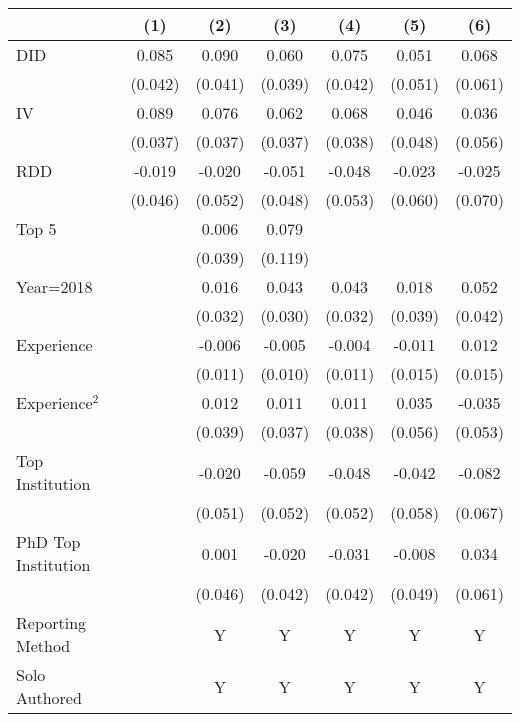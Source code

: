 \begin{tabular}{l*{6}{c}}
\hline\hline
                &\multicolumn{1}{c}{(1)}&\multicolumn{1}{c}{(2)}&\multicolumn{1}{c}{(3)}&\multicolumn{1}{c}{(4)}&\multicolumn{1}{c}{(5)}&\multicolumn{1}{c}{(6)}\\
\hline
DID             &    0.085&    0.090&    0.060&    0.075&    0.051&    0.068\\
                &  (0.042)&  (0.041)&  (0.039)&  (0.042)&  (0.051)&  (0.061)\\
IV              &    0.089&    0.076&    0.062&    0.068&    0.046&    0.036\\
                &  (0.037)&  (0.037)&  (0.037)&  (0.038)&  (0.048)&  (0.056)\\
RDD             &   -0.019&   -0.020&   -0.051&   -0.048&   -0.023&   -0.025\\
                &  (0.046)&  (0.052)&  (0.048)&  (0.053)&  (0.060)&  (0.070)\\
Top 5           &         &    0.006&    0.079&         &         &         \\
                &         &  (0.039)&  (0.119)&         &         &         \\
Year=2018       &         &    0.016&    0.043&    0.043&    0.018&    0.052\\
                &         &  (0.032)&  (0.030)&  (0.032)&  (0.039)&  (0.042)\\
Experience      &         &   -0.006&   -0.005&   -0.004&   -0.011&    0.012\\
                &         &  (0.011)&  (0.010)&  (0.011)&  (0.015)&  (0.015)\\
Experience$^2$  &         &    0.012&    0.011&    0.011&    0.035&   -0.035\\
                &         &  (0.039)&  (0.037)&  (0.038)&  (0.056)&  (0.053)\\
Top Institution &         &   -0.020&   -0.059&   -0.048&   -0.042&   -0.082\\
                &         &  (0.051)&  (0.052)&  (0.052)&  (0.058)&  (0.067)\\
PhD Top Institution&         &    0.001&   -0.020&   -0.031&   -0.008&    0.034\\
                &         &  (0.046)&  (0.042)&  (0.042)&  (0.049)&  (0.061)\\
Reporting Method &         &        Y&        Y&        Y&        Y&        Y\\
Solo Authored   &         &        Y&        Y&        Y&        Y&        Y\\

\end{tabular}
